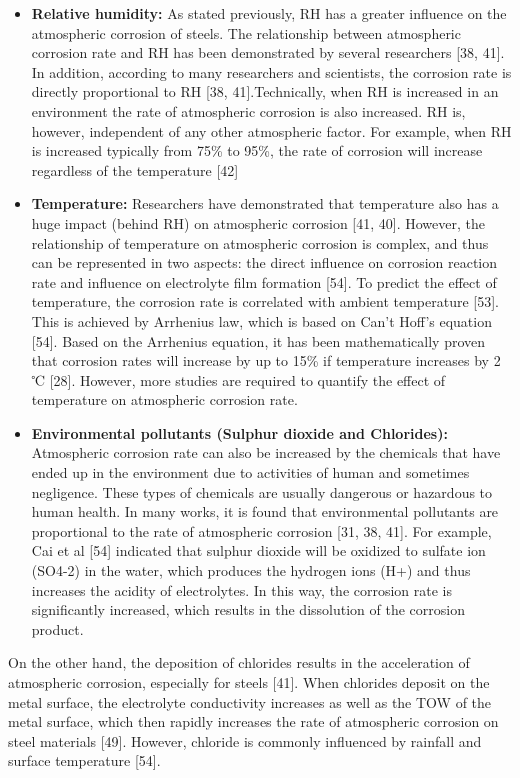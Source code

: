 \documentclass[12pt]{report}
\begin{document}
\begin{itemize}
    \item \textbf{Relative humidity:} As stated previously, RH has a greater influence on the atmospheric corrosion of steels. The relationship between atmospheric corrosion rate and RH has been demonstrated by several researchers [38, 41]. In addition, according to many researchers and scientists, the corrosion rate is directly proportional to RH [38, 41].Technically, when RH is increased in an environment the rate of atmospheric corrosion is also increased. RH is, however, independent of any other atmospheric factor. For example, when RH is increased typically from 75\% to 95\%, the rate of corrosion will increase regardless of the temperature [42]
    
    \item \textbf{Temperature:}  Researchers have demonstrated that temperature also has a huge impact (behind RH) on atmospheric corrosion [41, 40]. However, the relationship of temperature on atmospheric corrosion is complex, and thus can be represented in two aspects: the direct influence on corrosion reaction rate and influence on electrolyte film formation [54]. To predict the effect of temperature, the corrosion rate is correlated with ambient temperature [53].  This is achieved by Arrhenius law, which is based on Can't Hoff’s equation [54]. Based on the Arrhenius equation, it has been mathematically proven that corrosion rates will increase by up to 15\% if temperature increases by 2 ℃ [28]. However, more studies are required to quantify the effect of temperature on atmospheric corrosion rate.  
    
    \item \textbf{Environmental pollutants (Sulphur dioxide and Chlorides):} Atmospheric corrosion rate can also be increased by the chemicals that have ended up in the environment due to activities of human and sometimes negligence. These types of chemicals are usually dangerous or hazardous to human health. In many works, it is found that environmental pollutants are proportional to the rate of atmospheric corrosion [31, 38, 41]. For example, Cai et al [54] indicated that sulphur dioxide will be oxidized to sulfate ion (SO4-2) in the water, which produces the hydrogen ions (H+) and thus increases the acidity of electrolytes. In this way, the corrosion rate is significantly increased, which results in the dissolution of the corrosion product.
\end{itemize}
    
On the other hand, the deposition of chlorides results in the acceleration of atmospheric corrosion, especially for steels [41]. When chlorides deposit on the metal surface, the electrolyte conductivity increases as well as the TOW of the metal surface, which then rapidly increases the rate of atmospheric corrosion on steel materials [49]. However, chloride is commonly influenced by rainfall and surface temperature [54].
\end{document}
